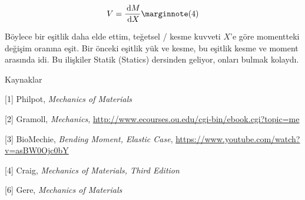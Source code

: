 \documentclass[12pt,fleqn]{article}\usepackage{../../common}
\begin{document}
$$
V = \frac{\ud M}{\ud X}
\mlabel{4}
$$

Böylece bir eşitlik daha elde ettim, teğetsel / kesme kuvveti $X$'e göre
momentteki değişim oranına eşit. Bir önceki eşitlik yük ve kesme, bu eşitlik
kesme ve moment arasında idi. Bu ilişkiler Statik (Statics) dersinden
geliyor, onları bulmak kolaydı.

Kaynaklar

[1] Philpot, {\em Mechanics of Materials}

[2] Gramoll, {\em Mechanics},
    \url{http://www.ecourses.ou.edu/cgi-bin/ebook.cgi?topic=me}

[3] BioMechie, {\em Bending Moment, Elastic Case},
    \url{https://www.youtube.com/watch?v=asBW0Ojc0bY}
    
[4] Craig, {\em Mechanics of Materials, Third Edition}

[6] Gere, {\em Mechanics of Materials}
\end{document}
